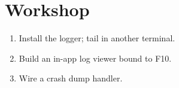 \section*{Workshop}

\begin{enumerate}[leftmargin=*]
  \item Install the logger; tail in another terminal.
  \item Build an in-app log viewer bound to F10.
  \item Wire a crash dump handler.
\end{enumerate}
